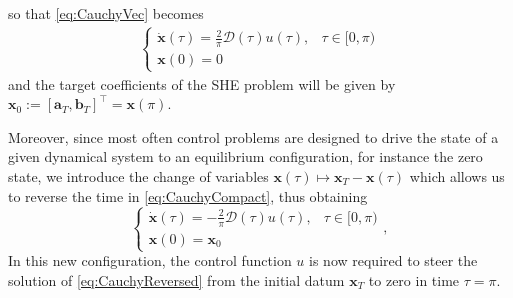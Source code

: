so that \eqref{eq:CauchyVec} becomes
\begin{align}\label{eq:CauchyCompact}
	\begin{cases}
		\displaystyle\dot{\bm{x}}(\tau) = \frac 2\pi\bm{\mathcal{D}}(\tau) u(\tau),  & \tau \in [0,\pi)
		\\[6pt]
		\bm{x}(0) = {0}
	\end{cases}
\end{align}
and the target coefficients of the SHE problem will be given by $\bm{x}_0:=[\bm{a}_T,\bm{b}_T]^\top=\bm{x}(\pi)$.


Moreover, since most often control problems are designed to drive the state of a given dynamical system to an equilibrium configuration, for instance the zero state, we introduce the change of variables $\bm{x}(\tau)\mapsto \bm{x}_T - \bm{x}(\tau)$ which allows us to reverse the time in \eqref{eq:CauchyCompact}, thus obtaining 
\begin{equation}\label{eq:CauchyReversed}
    \begin{cases}
        \displaystyle\dot{\bm{x}}(\tau) = -\frac 2\pi\bm{\mathcal{D}}(\tau)u(\tau),  & \tau \in [0,\pi)
        \\[6pt]
        \bm{x}(0) = \bm{x}_0
    \end{cases},
\end{equation}
In this new configuration, the control function $u$ is now required to steer the solution of \eqref{eq:CauchyReversed} from the initial datum $\bm{x}_T$ to zero in time $\tau=\pi$. 



